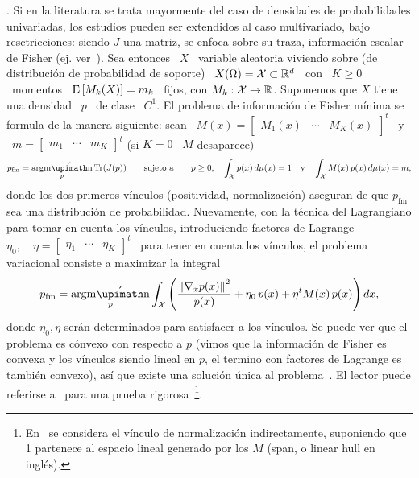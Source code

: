 .  Si  en la
literatura  se  trata  mayormente  del  caso  de  densidades  de  probabilidades
univariadas,  los estudios  pueden  ser extendidos  al  caso multivariado,  bajo
resctricciones: siendo $J$  una matriz, se enfoca sobre  su traza, informaci\'on
escalar de Fisher (ej.  ver~\cite{Fri98, Fri04}).  Sea entonces \ $X$ \ variable
aleatoria  viviendo  sobre (de  distribuci\'on  de  probabilidad de  soporte)  \
$X(\Omega) =  \mathcal{X} \subset \mathbb{R}^d$  \ con  \ $K \ge  0$ \ momentos  \ $\operatorname{E}\left[
M_k(X) \right] = m_k$ \ fijos, con  $M_k: \mathcal{X} \to \mathbb{R}$. Suponemos que $X$ tiene
una densidad \  $p$ \ de clase  \ $C^1$. El problema de  informaci\'on de Fisher
m\'inima  se formula  de la  manera siguiente:  sean \  $M(x) =  \begin{bmatrix}
M_1(x)  & \cdots  &  M_K(x) \end{bmatrix}^t$  \  y \  $m  = \begin{bmatrix}  m_1
& \cdots & m_K \end{bmatrix}^t$ (si $K = 0$ \ $M$ desaparece)
%
\[
p_{\mathrm{fm}}  =   \argmin_p  \Tr(J(p))  \qquad   \mbox{sujeto  a}  \qquad   p  \ge
0, \quad \int_\X p(x) \, d\mu(x) = 1 \quad \mbox{y}
\quad \int_\X M(x) \, p(x) \, d\mu(x) = m,
\]
%
donde los dos primeros v\'inculos (positividad, normalizaci\'on) aseguran de que
$p_{\mathrm{fm}}$  sea una  distribuci\'on de  probabilidad. Nuevamente,  con la
t\'ecnica del  Lagrangiano para  tomar en  cuenta los  v\'inculos, introduciendo
factores  de Lagrange  $\eta_0, \quad  \eta  = \begin{bmatrix}  \eta_1 &  \cdots
& \eta_K  \end{bmatrix}^t$ \ para  tener en  cuenta los v\'inculos,  el problema
variacional  consiste  a  maximizar la  integral~\cite{GelFom63,  Bru04,  Mil00,
CamMar09, CovTho06}
%
\[
p_{\mathrm{fm}}    =   \argmin_p    \int_\X   \left(    \frac{\left\|   \nabla_x
  p(x) \right\|^2}{p(x)} + \eta_0 \, p(x) + \eta^t M(x) \, p(x) \right) dx,
\]
%
donde $\eta_0, \eta$  ser\'an determinados para satisfacer a  los v\'inculos. Se
puede ver  que el problema  es c\'onvexo  con respecto a  $p$ (\ie vimos  que la
informaci\'on de  Fisher es convexa  y los v\'inculos  siendo lineal en  $p$, el
termino con  factores de Lagrange es  tambi\'en convexo), as\'i que  existe una
soluci\'on \'unica  al problema~\cite{GelFom63,  Wei74, Bru04,  Mil00, CamMar09,
Cla13,  Kom14}.  El lector  puede  referirse  a~\cite[Teo.~2.1]{Bor95} para  una
prueba   rigorosa~\footnote{En~\cite{Bor95}  se   considera   el  v\'inculo   de
normalizaci\'on  indirectamente, suponiendo  que 1  partenece al  espacio lineal
generado por los $M$ (span, o linear hull en ingl\'es).}.

